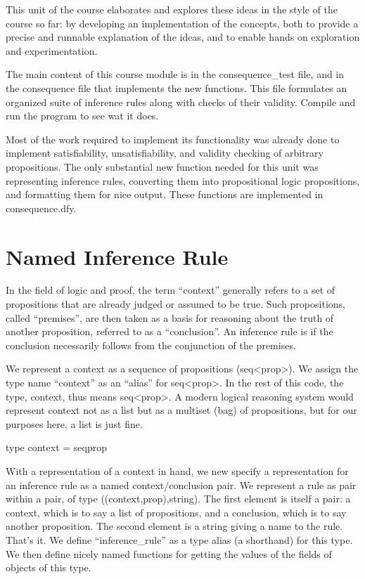 \documentclass[letterpaper,10pt,english]{sphinxmanual}
\begin{document}
This unit of the course elaborates and explores these ideas in the
style of the course so far: by developing an implementation of the
concepts, both to provide a precise and runnable explanation of the
ideas, and to enable hands on exploration and experimentation.

The main content of this course module is in the consequence\_test
file, and in the consequence file that implements the new
functions. This file formulates an organized suite of inference rules
along with checks of their validity. Compile and run the program to
see wat it does.

Most of the work required to implement its functionality was already
done to implement satisfiability, unsatisfiability, and validity
checking of arbitrary propositions. The only substantial new function
needed for this unit was representing inference rules, converting them
into propositional logic propositions, and formatting them for nice
output. These functions are implemented in consequence.dfy.


\section{Named Inference Rule}
\label{\detokenize{13-consequence:named-inference-rule}}
In the field of logic and proof, the term “context” generally refers
to a set of propositions that are already judged or assumed to be
true. Such propositions, called “premises”, are then taken as a basis
for reasoning about the truth of another proposition, referred to as a
“conclusion”. An inference rule is  if the conclusion
necessarily follows from the conjunction of the premises.

We represent a context as a sequence of propositions (seq\textless{}prop\textgreater{}).  We
assign the type name “context” as an “alias” for seq\textless{}prop\textgreater{}. In the
rest of this code, the type, context, thus means seq\textless{}prop\textgreater{}. A modern
logical reasoning system would represent context not as a list but as
a multiset (bag) of propositions, but for our purposes here, a list is
just fine.

\begin{sphinxVerbatim}[commandchars=\\\{\}]
type context = seq\PYGZlt{}prop\PYGZgt{}
\end{sphinxVerbatim}

With a representation of a context in hand, we new specify a
representation for an inference rule as a named context/conclusion
pair. We represent a rule as pair within a pair, of type
((context,prop),string).  The first element is itself a pair: a
context, which is to say a list of propositions, and a conclusion,
which is to say another proposition. The second element is a string
giving a name to the rule. That’s it. We define “inference\_rule” as a
type alias (a shorthand) for this type. We then define nicely named
functions for getting the values of the fields of objects of this
type.
\end{document}
